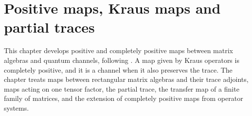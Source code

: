 \chapter{Positive maps, Kraus maps and partial traces}\label{ch:channels}

This chapter develops positive and completely positive maps between matrix
algebras and quantum channels, following
\cite[Chapters~1 and~2]{Wolf2012Quantum}. A map given by Kraus operators is
completely positive, and it is a channel when it also preserves the trace. The
chapter treats maps between rectangular matrix algebras and their trace
adjoints, maps acting on one tensor factor, the partial trace, the transfer map
of a finite family of matrices, and the extension of completely positive maps
from operator systems.






